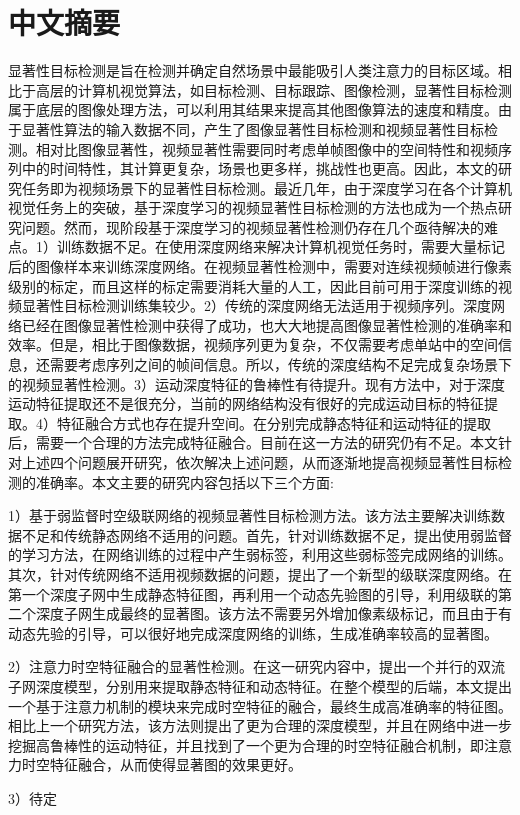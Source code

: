\chapter{中文摘要}
\renewcommand{\leftmark}{中文摘要}
显著性目标检测是旨在检测并确定自然场景中最能吸引人类注意力的目标区域。相比于高层的计算机视觉算法，如目标检测、目标跟踪、图像检测，显著性目标检测属于底层的图像处理方法，可以利用其结果来提高其他图像算法的速度和精度。由于显著性算法的输入数据不同，产生了图像显著性目标检测和视频显著性目标检测。相对比图像显著性，视频显著性需要同时考虑单帧图像中的空间特性和视频序列中的时间特性，其计算更复杂，场景也更多样，挑战性也更高。因此，本文的研究任务即为视频场景下的显著性目标检测。最近几年，由于深度学习在各个计算机视觉任务上的突破，基于深度学习的视频显著性目标检测的方法也成为一个热点研究问题。然而，现阶段基于深度学习的视频显著性检测仍存在几个亟待解决的难点。1）训练数据不足。在使用深度网络来解决计算机视觉任务时，需要大量标记后的图像样本来训练深度网络。在视频显著性检测中，需要对连续视频帧进行像素级别的标定，而且这样的标定需要消耗大量的人工，因此目前可用于深度训练的视频显著性目标检测训练集较少。2）传统的深度网络无法适用于视频序列。深度网络已经在图像显著性检测中获得了成功，也大大地提高图像显著性检测的准确率和效率。但是，相比于图像数据，视频序列更为复杂，不仅需要考虑单站中的空间信息，还需要考虑序列之间的帧间信息。所以，传统的深度结构不足完成复杂场景下的视频显著性检测。3）运动深度特征的鲁棒性有待提升。现有方法中，对于深度运动特征提取还不是很充分，当前的网络结构没有很好的完成运动目标的特征提取。4）特征融合方式也存在提升空间。在分别完成静态特征和运动特征的提取后，需要一个合理的方法完成特征融合。目前在这一方法的研究仍有不足。本文针对上述四个问题展开研究，依次解决上述问题，从而逐渐地提高视频显著性目标检测的准确率。本文主要的研究内容包括以下三个方面:

1）基于弱监督时空级联网络的视频显著性目标检测方法。该方法主要解决训练数据不足和传统静态网络不适用的问题。首先，针对训练数据不足，提出使用弱监督的学习方法，在网络训练的过程中产生弱标签，利用这些弱标签完成网络的训练。其次，针对传统网络不适用视频数据的问题，提出了一个新型的级联深度网络。在第一个深度子网中生成静态特征图，再利用一个动态先验图的引导，利用级联的第二个深度子网生成最终的显著图。该方法不需要另外增加像素级标记，而且由于有动态先验的引导，可以很好地完成深度网络的训练，生成准确率较高的显著图。

2）注意力时空特征融合的显著性检测。在这一研究内容中，提出一个并行的双流子网深度模型，分别用来提取静态特征和动态特征。在整个模型的后端，本文提出一个基于注意力机制的模块来完成时空特征的融合，最终生成高准确率的特征图。相比上一个研究方法，该方法则提出了更为合理的深度模型，并且在网络中进一步挖掘高鲁棒性的运动特征，并且找到了一个更为合理的时空特征融合机制，即注意力时空特征融合，从而使得显著图的效果更好。

3）待定
